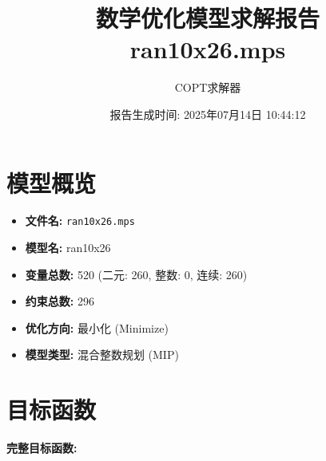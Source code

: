 \documentclass[a4paper,10pt]{article}
\title{数学优化模型求解报告\\{\large ran10x26.mps}}
\author{COPT求解器}
\date{报告生成时间: 2025年07月14日 10:44:12}
\begin{document}
\maketitle
\tableofcontents
\newpage

\section{模型概览}
\begin{itemize}
    \item \textbf{文件名:} \texttt{ran10x26.mps}
    \item \textbf{模型名:} ran10x26
    \item \textbf{变量总数:} 520 (二元: 260, 整数: 0, 连续: 260)
    \item \textbf{约束总数:} 296
    \item \textbf{优化方向:} 最小化 (Minimize)
    \item \textbf{模型类型:} 混合整数规划 (MIP)
\end{itemize}
\section{目标函数}

\textbf{完整目标函数:}
\end{document}
